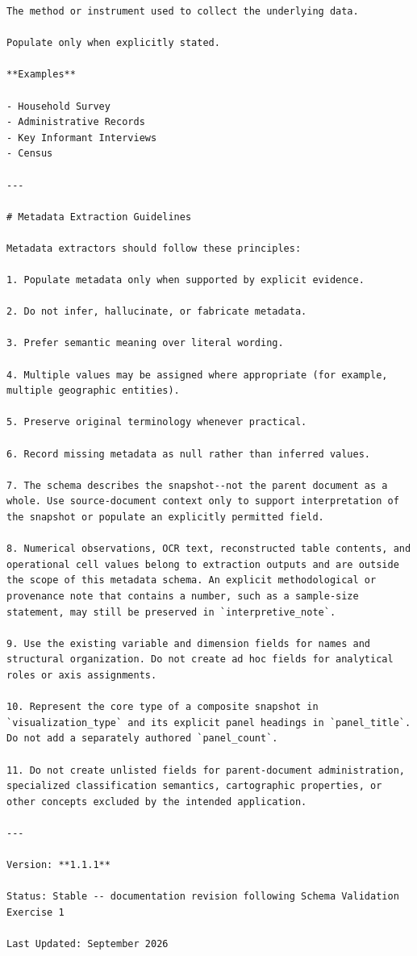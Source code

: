 \documentclass{article}
\begin{document}
\begin{lstlisting}
The method or instrument used to collect the underlying data.

Populate only when explicitly stated.

**Examples**

- Household Survey
- Administrative Records
- Key Informant Interviews
- Census

---

# Metadata Extraction Guidelines

Metadata extractors should follow these principles:

1. Populate metadata only when supported by explicit evidence.

2. Do not infer, hallucinate, or fabricate metadata.

3. Prefer semantic meaning over literal wording.

4. Multiple values may be assigned where appropriate (for example, multiple geographic entities).

5. Preserve original terminology whenever practical.

6. Record missing metadata as null rather than inferred values.

7. The schema describes the snapshot--not the parent document as a whole. Use source-document context only to support interpretation of the snapshot or populate an explicitly permitted field.

8. Numerical observations, OCR text, reconstructed table contents, and operational cell values belong to extraction outputs and are outside the scope of this metadata schema. An explicit methodological or provenance note that contains a number, such as a sample-size statement, may still be preserved in `interpretive_note`.

9. Use the existing variable and dimension fields for names and structural organization. Do not create ad hoc fields for analytical roles or axis assignments.

10. Represent the core type of a composite snapshot in `visualization_type` and its explicit panel headings in `panel_title`. Do not add a separately authored `panel_count`.

11. Do not create unlisted fields for parent-document administration, specialized classification semantics, cartographic properties, or other concepts excluded by the intended application.

---

Version: **1.1.1**

Status: Stable -- documentation revision following Schema Validation Exercise 1

Last Updated: September 2026
\end{lstlisting}
\end{document}
